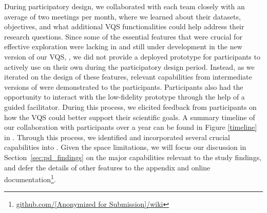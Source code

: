   \par {} During participatory design, we collaborated with each team closely with an average of two meetings per month, where we learned about their datasets, objectives, and what additional VQS functionalities could help address their research questions. Since some of the essential features that were crucial for effective exploration were lacking in \zv and still under development in the new version of our VQS, \zvpp, we did not provide a deployed prototype for participants to actively use on their own during the participatory design period. Instead, as we iterated on the design of these features, relevant capabilities from intermediate versions of \zvpp were demonstrated to the participants. Participants also had the opportunity to interact with the low-fidelity prototype through the help of a guided facilitator. %
  During this process, we elicited feedback from participants on how the VQS could better support their scientific goals. A summary timeline of our collaboration with participants over a year can be found in Figure \ref{timeline} in . %
  Through this process, we identified and incorporated several crucial capabilities into \zvpp{}. Given the space limitations, we will focus our discussion in Section~\ref{sec:pd_findings} on the major capabilities relevant to the study findings, and defer the details of other features to the appendix and online documentation\footnote{\url{github.com/[Anonymized for Submission]/wiki}}.

